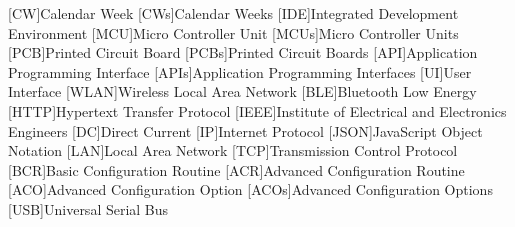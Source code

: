 % 
\begin{acronym}[STATCOM]    %
%
[CW]{Calendar Week}
[CWs]{Calendar Weeks}
%
[IDE]{Integrated Development Environment}
%
[MCU]{Micro Controller Unit}
[MCUs]{Micro Controller Units}
%
[PCB]{Printed Circuit Board}
[PCBs]{Printed Circuit Boards}
%
[API]{Application Programming Interface}
[APIs]{Application Programming Interfaces}
%
[UI]{User Interface}
%
[WLAN]{Wireless Local Area Network}
%
[BLE]{Bluetooth Low Energy}
%
[HTTP]{Hypertext Transfer Protocol}
%
[IEEE]{Institute of Electrical and Electronics Engineers}
%
[DC]{Direct Current}
%
[IP]{Internet Protocol}
%
[JSON]{JavaScript Object Notation}
%
[LAN]{Local Area Network}
%
[TCP]{Transmission Control Protocol}
%
[BCR]{Basic Configuration Routine}
%
[ACR]{Advanced Configuration Routine}
%
[ACO]{Advanced Configuration Option}
[ACOs]{Advanced Configuration Options}
%
[USB]{Universal Serial Bus}
%
\end{acronym}
%